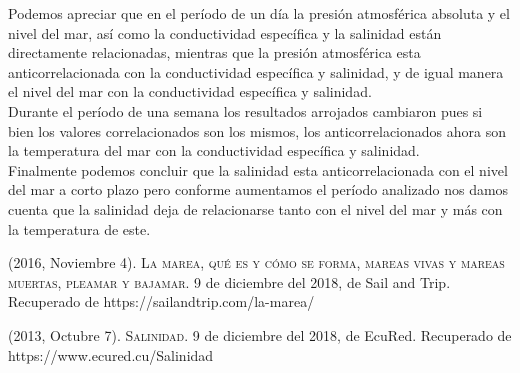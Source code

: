 \documentclass[12pt]{article}
\begin{document}
Podemos apreciar que en el período de un día la presión atmosférica absoluta y el nivel del mar, así como la conductividad específica y la salinidad están directamente relacionadas, mientras que la presión atmosférica esta anticorrelacionada con la conductividad específica y salinidad, y de igual manera el nivel del mar con la conductividad específica y salinidad. \\
\indent Durante el período de una semana los resultados arrojados cambiaron pues si bien los valores correlacionados son los mismos, los anticorrelacionados ahora son la temperatura del mar con la conductividad específica y salinidad. \\
\indent Finalmente podemos concluir que la salinidad esta anticorrelacionada con el nivel del mar a corto plazo pero conforme aumentamos el período analizado nos damos cuenta que la salinidad deja de relacionarse tanto con el nivel del mar y más con la temperatura de este.

\begin{thebibliography}{9}
	 (2016, Noviembre 4). \textsc{La marea, qué es y cómo se forma, mareas vivas y mareas muertas, pleamar y bajamar}. 9 de diciembre del 2018, de Sail and Trip. Recuperado de https://sailandtrip.com/la-marea/
	
	 (2013, Octubre 7). \textsc{Salinidad}. 9 de diciembre del 2018, de EcuRed. Recuperado de https://www.ecured.cu/Salinidad

\end{thebibliography}
\end{document}
